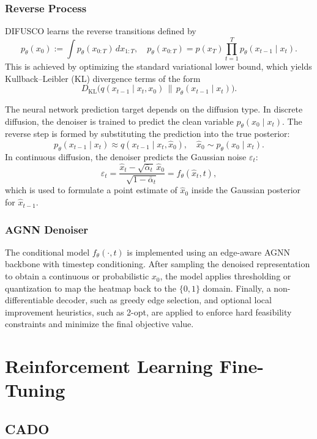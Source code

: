 \subsubsection{Reverse Process}
\label{subsec:difusco-reverse}

DIFUSCO learns the reverse transitions defined by
\[
p_\theta(x_0) := \int p_\theta(x_{0:T})\,dx_{1:T},\quad
p_\theta(x_{0:T}) = p(x_T)\prod_{t=1}^T p_\theta(x_{t-1}\mid x_t).
\]
This is achieved by optimizing the standard variational lower bound, which yields
Kullback--Leibler (KL) divergence terms of the form
\[
D_{\mathrm{KL}}\big(q(x_{t-1}\mid x_t,x_0)\,\|\,p_\theta(x_{t-1}\mid x_t)\big).
\]

The neural network prediction target depends on the diffusion type. In discrete diffusion,
the denoiser is trained to predict the clean variable $p_\theta(x_0\mid x_t)$. The reverse
step is formed by substituting the prediction into the true posterior:
\[
p_\theta(x_{t-1}\mid x_t) \approx q(x_{t-1}\mid x_t,\hat{x}_0),\quad
\hat{x}_0\sim p_\theta(x_0\mid x_t).
\]
In continuous diffusion, the denoiser predicts the Gaussian noise $\varepsilon_t$:
\[
\varepsilon_t
= \frac{\hat{x}_t-\sqrt{\bar{\alpha}_t}\,\hat{x}_0}
{\sqrt{1-\bar{\alpha}_t}}
= f_\theta(\hat{x}_t,t),
\]
which is used to formulate a point estimate of $\hat{x}_0$ inside the Gaussian posterior for
$\hat{x}_{t-1}$.

\subsubsection{AGNN Denoiser}
\label{subsec:difusco-agnn-denoiser}

The conditional model $f_\theta(\cdot,t)$ is implemented using an edge-aware AGNN backbone
with timestep conditioning. After sampling the denoised representation to obtain a continuous
or probabilistic $x_0$, the model applies thresholding or quantization to map the heatmap back
to the $\{0,1\}$ domain. Finally, a non-differentiable decoder, such as greedy edge selection,
and optional local improvement heuristics, such as 2-opt, are applied to enforce hard
feasibility constraints and minimize the final objective value.

\section{Reinforcement Learning Fine-Tuning}
\label{sec:rl-ft}

\subsection{CADO}
\label{subsec:cado}

